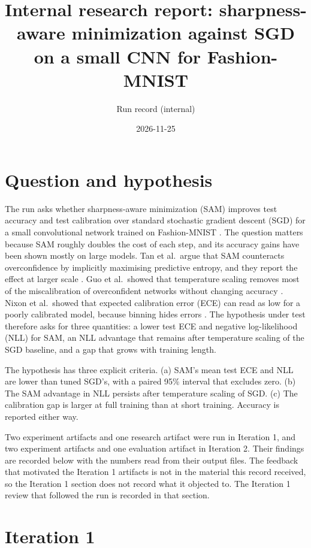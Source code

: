 \documentclass[11pt,letterpaper]{article}
\title{Internal research report: sharpness-aware minimization against SGD on a small CNN for Fashion-MNIST}
\author{Run record (internal)}
\date{2026-11-25}
\begin{document}
\maketitle
\tableofcontents

\section{Question and hypothesis}

The run asks whether sharpness-aware minimization (SAM) \citep{foret2021} improves test accuracy and test calibration over standard stochastic gradient descent (SGD) for a small convolutional network trained on Fashion-MNIST \citep{xiao2017}. The question matters because SAM roughly doubles the cost of each step, and its accuracy gains have been shown mostly on large models. Tan et al.\ argue that SAM counteracts overconfidence by implicitly maximising predictive entropy, and they report the effect at larger scale \citep{tan2026}. Guo et al.\ showed that temperature scaling removes most of the miscalibration of overconfident networks without changing accuracy \citep{guo2017}. Nixon et al.\ showed that expected calibration error (ECE) can read as low for a poorly calibrated model, because binning hides errors \citep{nixon2019}. The hypothesis under test therefore asks for three quantities: a lower test ECE and negative log-likelihood (NLL) for SAM, an NLL advantage that remains after temperature scaling of the SGD baseline, and a gap that grows with training length.

The hypothesis has three explicit criteria. (a) SAM's mean test ECE and NLL are lower than tuned SGD's, with a paired 95\% interval that excludes zero. (b) The SAM advantage in NLL persists after temperature scaling of SGD. (c) The calibration gap is larger at full training than at short training. Accuracy is reported either way.

Two experiment artifacts and one research artifact were run in Iteration 1, and two experiment artifacts and one evaluation artifact in Iteration 2. Their findings are recorded below with the numbers read from their output files. The feedback that motivated the Iteration 1 artifacts is not in the material this record received, so the Iteration 1 section does not record what it objected to. The Iteration 1 review that followed the run is recorded in that section.

\section{Iteration 1}
\end{document}
